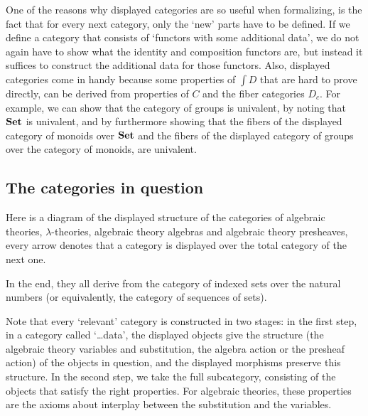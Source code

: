 One of the reasons why displayed categories are so useful when formalizing, is the fact that for every next category, only the `new' parts have to be defined. If we define a category that consists of `functors with some additional data', we do not again have to show what the identity and composition functors are, but instead it suffices to construct the additional data for those functors. Also, displayed categories come in handy because some properties of $ \int D $ that are hard to prove directly, can be derived from properties of $ C $ and the fiber categories $ D_c $. For example, we can show that the category of groups is univalent, by noting that $ \mathbf{Set} $ is univalent, and by furthermore showing that the fibers of the displayed category of monoids over $ \mathbf{Set} $ and the fibers of the displayed category of groups over the category of monoids, are univalent.

\subsection{The categories in question}\label{subsec:formalized-categories}

Here is a diagram of the displayed structure of the categories of algebraic theories, $ \lambda $-theories, algebraic theory algebras and algebraic theory presheaves, every arrow denotes that a category is displayed over the total category of the next one.
\begin{center}
\end{center}
In the end, they all derive from the category of indexed sets over the natural numbers (or equivalently, the category of sequences of sets).

Note that every `relevant' category is constructed in two stages: in the first step, in a category called `\dots data', the displayed objects give the structure (the algebraic theory variables and substitution, the algebra action or the presheaf action) of the objects in question, and the displayed morphisms preserve this structure. In the second step, we take the full subcategory, consisting of the objects that satisfy the right properties. For algebraic theories, these properties are the axioms about interplay between the substitution and the variables.

